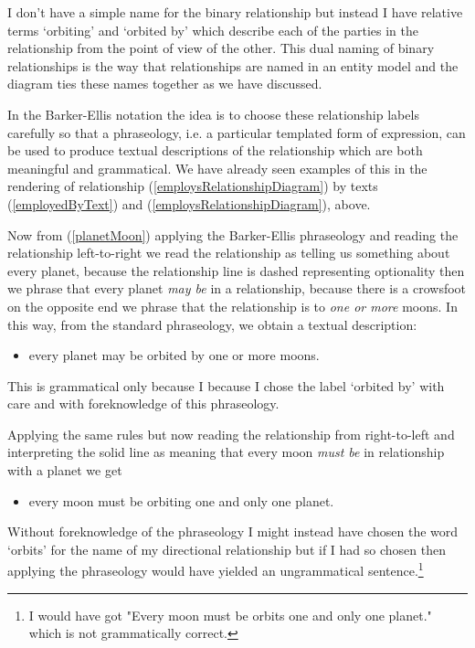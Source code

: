 I don't have a simple name for the binary relationship but instead I have  relative terms `orbiting' and `orbited by' which describe each of the parties in the relationship from the point of view of the other. This dual naming of binary relationships is the way that relationships are named in an entity model and the diagram ties these names together as we have discussed.

\mynote
In the Barker-Ellis notation the idea is to choose these relationship labels
carefully so that a phraseology, i.e. a particular templated form of expression,
can be used to produce textual descriptions of the relationship which are both meaningful and grammatical.
We have already seen examples of this in the rendering of
relationship (\ref{employsRelationshipDiagram}) by texts 
(\ref{employedByText}) and (\ref{employsRelationshipDiagram}), above.

Now from (\ref{planetMoon}) applying the Barker-Ellis  phraseology and reading the 
relationship left-to-right we read the relationship as telling us something about every planet, because the relationship line is dashed representing optionality then we phrase that every planet \textit{may be} 
in a relationship,
because there is a crowsfoot on the opposite end we phrase that the relationship is to 
\textit{one or more} moons.  In this way, from the standard phraseology, we obtain a textual description:
\begin{itemize}
\renewcommand\labelitemi{--}
\item every planet may be orbited by one or more moons.
\end{itemize}
This is grammatical only because I 
because I chose the label `orbited by' with care and with foreknowledge of this  phraseology.
 
Applying the same rules but now reading  the relationship from right-to-left and interpreting the solid line as 
 meaning that every moon \textit{must be} in relationship with a planet we get
\begin{itemize}
\renewcommand\labelitemi{--}
\item every moon must be orbiting  one and only one planet.
\end{itemize}
Without foreknowledge of the phraseology I might instead have chosen the word `orbits' for the name of my directional relationship but if I had so chosen then applying the phraseology would have yielded an ungrammatical sentence.\footnote{I would have got "Every moon must be orbits one and only one planet." which is not grammatically correct.}

